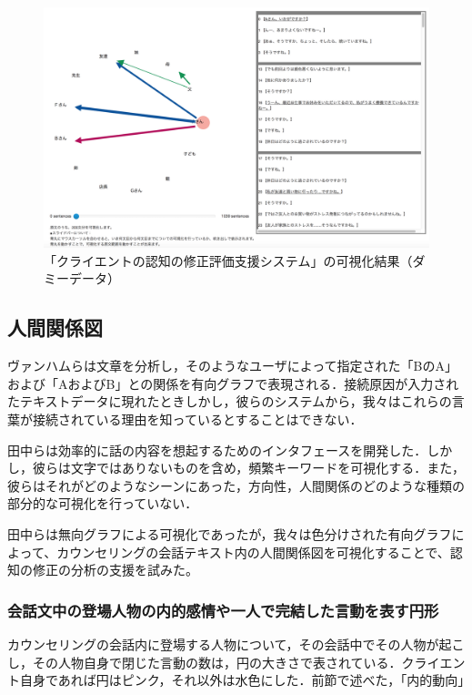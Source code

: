 \documentclass[shuuron]{kuee}
\begin{document}
\begin{figure}
  \begin{center}
    \includegraphics[width=\linewidth]{dummyChara.png}
  \end{center}
  \caption{「クライエントの認知の修正評価支援システム」の可視化結果（ダミーデータ）}
  \label{fig:dummyChara}
\end{figure}

\subsection{人間関係図}

ヴァンハムら\cite{van2009mapping}は文章を分析し，そのようなユーザによって指定された「BのA」および「AおよびB」との関係を有向グラフで表現される．接続原因が入力されたテキストデータに現れたときしかし，彼らのシステムから，我々はこれらの言葉が接続されている理由を知っているとすることはできない．

田中ら\cite{tanaka}は効率的に話の内容を想起するためのインタフェースを開発した．しかし，彼らは文字ではありないものを含め，頻繁キーワードを可視化する．また，彼らはそれがどのようなシーンにあった，方向性，人間関係のどのような種類の部分的な可視化を行っていない．

田中らは無向グラフによる可視化であったが，我々は色分けされた有向グラフによって、カウンセリングの会話テキスト内の人間関係図を可視化することで、認知の修正の分析の支援を試みた。

\subsubsection{会話文中の登場人物の内的感情や一人で完結した言動を表す円形}

カウンセリングの会話内に登場する人物について，その会話中でその人物が起こし，その人物自身で閉じた言動の数は，円の大きさで表されている．クライエント自身であれば円はピンク，それ以外は水色にした．前節で述べた，「内的動向」
\end{document}
